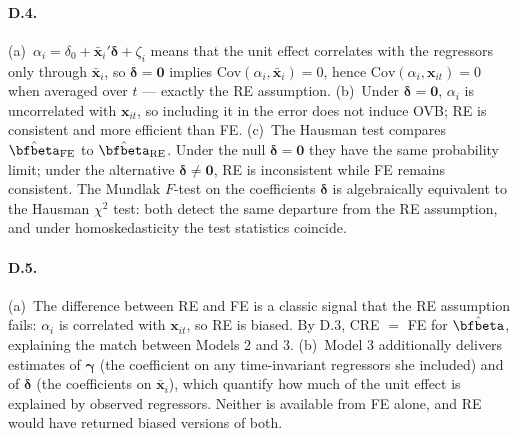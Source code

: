 \documentclass{article}
\begin{document}
\paragraph{D.4.}  (a)~$\alpha_i = \delta_0 + \bar{\bm x}_i'\bm\delta + \zeta_i$ means that the unit effect correlates with the regressors only through $\bar{\bm x}_i$, so $\bm\delta = \bm 0$ implies $\text{Cov}(\alpha_i, \bar{\bm x}_i) = 0$, hence $\text{Cov}(\alpha_i, \bm x_{it}) = 0$ when averaged over $t$ --- exactly the RE assumption.  (b)~Under $\bm\delta = \bm 0$, $\alpha_i$ is uncorrelated with $\bm x_{it}$, so including it in the error does not induce OVB; RE is consistent and more efficient than FE.  (c)~The Hausman test compares $\hat\bfbeta_{\text{FE}}$ to $\hat\bfbeta_{\text{RE}}$.  Under the null $\bm\delta = \bm 0$ they have the same probability limit; under the alternative $\bm\delta\neq\bm 0$, RE is inconsistent while FE remains consistent.  The Mundlak $F$-test on the coefficients $\bm\delta$ is algebraically equivalent to the Hausman $\chi^2$ test: both detect the same departure from the RE assumption, and under homoskedasticity the test statistics coincide.

\paragraph{D.5.}  (a)~The difference between RE and FE is a classic signal that the RE assumption fails: $\alpha_i$ is correlated with $\bm x_{it}$, so RE is biased.  By D.3, CRE $=$ FE for $\hat\bfbeta$, explaining the match between Models 2 and 3.  (b)~Model 3 additionally delivers estimates of $\bm\gamma$ (the coefficient on any time-invariant regressors she included) and of $\bm\delta$ (the coefficients on $\bar{\bm x}_i$), which quantify how much of the unit effect is explained by observed regressors.  Neither is available from FE alone, and RE would have returned biased versions of both.
\end{document}
